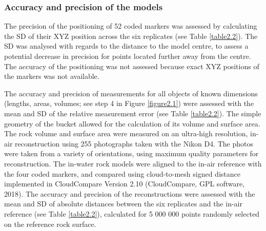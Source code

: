 \subsubsection{Accuracy and precision of the models}\label{chapitre2_2.3.3}
The precision of the positioning of 52 coded markers was assessed by calculating the SD of their XYZ position across the six replicates (see Table \ref{table2.2}). The SD was analysed with regards to the distance to the model centre, to assess a potential decrease in precision for points located further away from the centre. The accuracy of the positioning was not assessed because exact XYZ positions of the markers was not available.

The accuracy and precision of measurements for all objects of known dimensions (lengths, areas, volumes; see step 4 in Figure \ref{figure2.1}) were assessed with the mean and SD of the relative measurement error (see Table \ref{table2.2}). The simple geometry of the bucket allowed for the calculation of its volume and surface area. The rock volume and surface area were measured on an ultra-high resolution, in-air reconstruction \citep{bryson_characterization_2017} using 255 photographs taken with the Nikon D4. The photos were taken from a variety of orientations, using maximum quality parameters for reconstruction. The in-water rock models were aligned to the in-air reference with the four coded markers, and compared using cloud-to-mesh signed distance implemented in CloudCompare Version 2.10 (CloudCompare, GPL software, 2018). The accuracy and precision of the reconstructions were assessed with the mean and SD of absolute distances between the six replicates and the in-air reference (see Table \ref{table2.2}), calculated for 5 000 000 points randomly selected on the reference rock surface.

